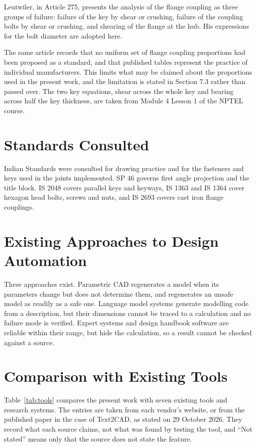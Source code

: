 Leutwiler, in Article 275, presents the analysis of the flange coupling as three groups of failure: failure of the key by shear or crushing, failure of the coupling bolts by shear or crushing, and shearing of the flange at the hub. His expressions for the bolt diameter are adopted here.

The same article records that no uniform set of flange coupling proportions had been proposed as a standard, and that published tables represent the practice of individual manufacturers. This limits what may be claimed about the proportions used in the present work, and the limitation is stated in Section 7.3 rather than passed over. The two key equations, shear across the whole key and bearing across half the key thickness, are taken from Module 4 Lesson 1 of the NPTEL course.

\section{Standards Consulted}

Indian Standards were consulted for drawing practice and for the fasteners and keys used in the joints implemented. SP 46 governs first angle projection and the title block. IS 2048 covers parallel keys and keyways, IS 1363 and IS 1364 cover hexagon head bolts, screws and nuts, and IS 2693 covers cast iron flange couplings.

\section{Existing Approaches to Design Automation}

Three approaches exist. Parametric CAD regenerates a model when its parameters change but does not determine them, and regenerates an unsafe model as readily as a safe one. Language model systems generate modelling code from a description, but their dimensions cannot be traced to a calculation and no failure mode is verified. Expert systems and design handbook software are reliable within their range, but hide the calculation, so a result cannot be checked against a source.

\section{Comparison with Existing Tools}

Table~\ref{tab:tools} compares the present work with seven existing tools and research systems. The entries are taken from each vendor's website, or from the published paper in the case of Text2CAD, as stated on 29 October 2026. They record what each source claims, not what was found by testing the tool, and ``Not stated'' means only that the source does not state the feature.

